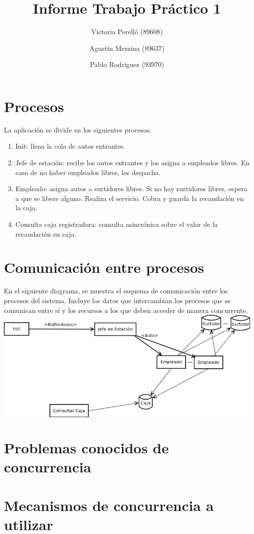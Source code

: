 \documentclass{article}
\begin{document}
\title{Informe Trabajo Práctico 1}
\author{Victoria Perelló (89608)\\
        \and
        Agustín Mezzina (89637)\\
	\and
        Pablo Rodríguez (93970)}
\maketitle

\section{Procesos}
La aplicación se divide en los siguientes procesos:
\begin{enumerate}
\item Init: llena la cola de autos entrantes.
\item Jefe de estación: recibe los autos entrantes y los asigna a empleados libres. En caso de no haber empleados libres, los despacha.
\item Empleado: asigna autos a surtidores libres. Si no hay surtidores libres, espera a que se libere alguno. Realiza el servicio. Cobra y guarda la recaudación en la caja.
\item Consulta caja registradora: consulta asincrónica sobre el valor de la recaudación en caja.
\end{enumerate}

\section{Comunicación entre procesos}
En el siguiente diagrama, se muestra el esquema de comunicación entre los procesos del sistema. Incluye los datos que intercambian los procesos que se comunican entre sí y los recursos a los que deben acceder de manera concurrente.
\\[1\baselineskip]
\includegraphics[width=\textwidth]{overview}

\section{Problemas conocidos de concurrencia}

\section{Mecanismos de concurrencia a utilizar}
\end{document}
